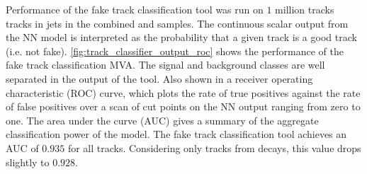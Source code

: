 Performance of the fake track classification tool was run on $1$ million tracks tracks in jets in the combined \ttbar and \Zprime samples.
The continuous scalar output from the NN model is interpreted as the probability that a given track is a good track (i.e. not fake).
\cref{fig:track_classifier_output_roc} shows the performance of the fake track classification MVA. The signal and background classes are well separated in the output of the tool.
Also shown in a receiver operating characteristic (ROC) curve, which plots the rate of true positives against the rate of false positives over a scan of cut points on the NN output ranging from zero to one.
The area under the curve (AUC) gives a summary of the aggregate classification power of the model.
The fake track classification tool achieves an AUC of $0.935$ for all tracks. Considering only tracks from \bhadron decays, this value drops slightly to $0.928$. 

